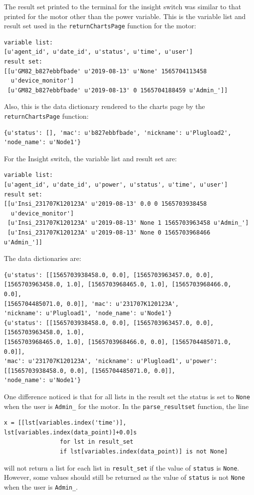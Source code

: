 \documentclass[fontsize=11pt, %
                             paper=letter, %
                             twoside, %
                             captions=tableheading,
                             index=totoc,
                             hyperref]{labbook}
\begin{document}
\begin{addmargin}[0cm]{0cm}
The result set printed to the terminal for the insight switch was similar to that printed for the motor other than the power variable. This is the variable list and result set used in the \texttt{returnChartsPage} function for the motor:
\begin{verbatim}
variable list:
[u'agent_id', u'date_id', u'status', u'time', u'user']
result set:
[[u'GM82_b827ebbfbade' u'2019-08-13' u'None' 1565704113458
  u'device_monitor']
 [u'GM82_b827ebbfbade' u'2019-08-13' 0 1565704188459 u'Admin_']]
\end{verbatim}
Also, this is the data dictionary rendered to the charts page by the \texttt{returnChartsPage} function:
\begin{verbatim}
{u'status': [], 'mac': u'b827ebbfbade', 'nickname': u'Plugload2', 
'node_name': u'Node1'}
\end{verbatim}
For the Insight switch, the variable list and result set are:
\begin{verbatim}
variable list:
[u'agent_id', u'date_id', u'power', u'status', u'time', u'user']
result set:
[[u'Insi_231707K120123A' u'2019-08-13' 0.0 0 1565703938458
  u'device_monitor']
 [u'Insi_231707K120123A' u'2019-08-13' None 1 1565703963458 u'Admin_']
 [u'Insi_231707K120123A' u'2019-08-13' None 0 1565703968466 u'Admin_']]
\end{verbatim}
The data dictionaries are:
\begin{verbatim}
{u'status': [[1565703938458.0, 0.0], [1565703963457.0, 0.0], 
[1565703963458.0, 1.0], [1565703968465.0, 1.0], [1565703968466.0, 0.0], 
[1565704485071.0, 0.0]], 'mac': u'231707K120123A', 
'nickname': u'Plugload1', 'node_name': u'Node1'}
{u'status': [[1565703938458.0, 0.0], [1565703963457.0, 0.0], [1565703963458.0, 1.0], 
[1565703968465.0, 1.0], [1565703968466.0, 0.0], [1565704485071.0, 0.0]], 
'mac': u'231707K120123A', 'nickname': u'Plugload1', u'power': 
[[1565703938458.0, 0.0], [1565704485071.0, 0.0]], 
'node_name': u'Node1'}
\end{verbatim}
One difference noticed is that for all lists in the result set the status is set to \texttt{None} when the user is \texttt{Admin\_} for the motor. In the \texttt{parse\_resultset} function, the line
\begin{verbatim}
x = [[lst[variables.index('time')], 
lst[variables.index(data_point)]+0.0]s
                for lst in result_set 
                if lst[variables.index(data_point)] is not None]
\end{verbatim}
will not return a list for each list in \texttt{result\_set} if the value of \texttt{status} is \texttt{None}. However, some values should still be returned as the value of \texttt{status} is not \texttt{None} when the user is \texttt{Admin\_}.

\end{addmargin}
\end{document}
